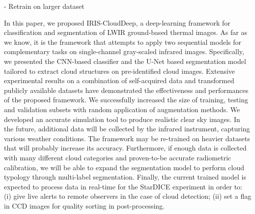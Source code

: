 \documentclass[amt, article]{copernicus}
\begin{document}
- Retrain on larger dataset

\conclusions[Conclusion]%
\label{sec:conclusion}

In this paper, we proposed IRIS-CloudDeep, a deep-learning framework for classification and segmentation of LWIR
ground-based thermal images. As far as we know, it is the framework that attempts to apply two sequential models for complementary tasks on single-channel gray-scaled infrared images. Specifically, we presented the CNN-based classifier and the U-Net based segmentation model tailored to extract cloud structures on pre-identified cloud images. Extensive experimental results on a combination of self-acquired data and transformed publicly available datasets have demonstrated
the effectiveness and performances of the proposed framework. We successfully increased the size of training, testing and validation subsets with random application of augmentation methods. We developed an accurate simulation tool to produce realistic clear sky images. In the future, additional data will be collected by the infrared instrument, capturing various weather conditions. The framework may be re-trained on heavier datasets that will probably increase its accuracy.  Furthermore, if enough data is collected with many different cloud categories and proven-to-be accurate radiometric calibration, we will be able to expand the segmentation model to perform cloud typology through multi-label segmentation. Finally, the current trained model is expected to process data in real-time for the StarDICE experiment in order to: (i) give live alerts to remote observers in the case of cloud detection; (ii) set a flag in CCD images for quality sorting in post-processing.








\end{document}
